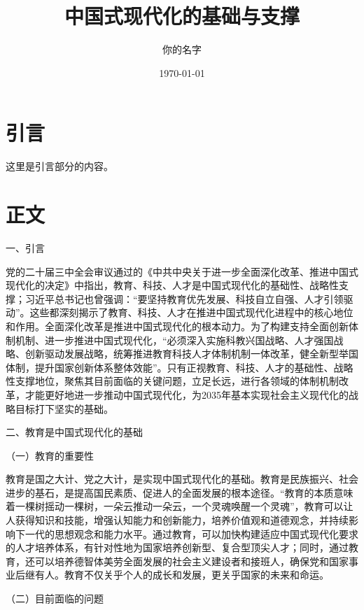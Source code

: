 \documentclass{article} %
\title{中国式现代化的基础与支撑}
\author{你的名字}
\date{\today}
\begin{document}
\begin{CJK*}{UTF8}{gbsn}

\maketitle %

\section{引言}
这里是引言部分的内容。

\section{正文}
一、引言

党的二十届三中全会审议通过的《中共中央关于进一步全面深化改革、推进中国式现代化的决定》中指出，教育、科技、人才是中国式现代化的基础性、战略性支撑；习近平总书记也曾强调：“要坚持教育优先发展、科技自立自强、人才引领驱动”。这些都深刻揭示了教育、科技、人才在推进中国式现代化进程中的核心地位和作用。全面深化改革是推进中国式现代化的根本动力。为了构建支持全面创新体制机制、进一步推进中国式现代化，“必须深入实施科教兴国战略、人才强国战略、创新驱动发展战略，统筹推进教育科技人才体制机制一体改革，健全新型举国体制，提升国家创新体系整体效能”。只有正视教育、科技、人才的基础性、战略性支撑地位，聚焦其目前面临的关键问题，立足长远，进行各领域的体制机制改革，才能更好地进一步推动中国式现代化，为2035年基本实现社会主义现代化的战略目标打下坚实的基础。

二、教育是中国式现代化的基础

（一）教育的重要性

教育是国之大计、党之大计，是实现中国式现代化的基础。教育是民族振兴、社会进步的基石，是提高国民素质、促进人的全面发展的根本途径。“教育的本质意味着一棵树摇动一棵树，一朵云推动一朵云，一个灵魂唤醒一个灵魂”，教育可以让人获得知识和技能，增强认知能力和创新能力，培养价值观和道德观念，并持续影响下一代的思想观念和能力水平。通过教育，可以加快构建适应中国式现代化要求的人才培养体系，有针对性地为国家培养创新型、复合型顶尖人才；同时，通过教育，还可以培养德智体美劳全面发展的社会主义建设者和接班人，确保党和国家事业后继有人。教育不仅关乎个人的成长和发展，更关乎国家的未来和命运。

（二）目前面临的问题


\end{CJK*}
\end{document}

